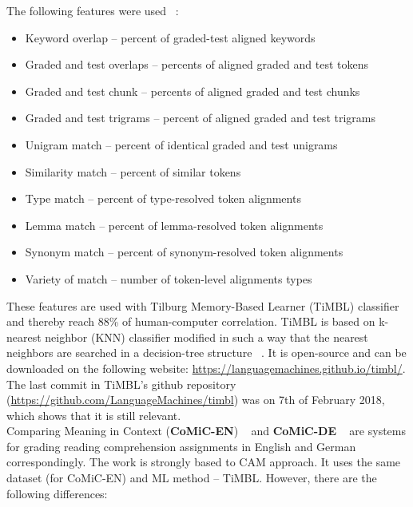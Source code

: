  The following features were used ~\cite{CAM}:
\begin{itemize}
\item Keyword overlap -- percent of graded-test aligned keywords 
\item Graded and test overlaps -- percents of aligned graded and test tokens 
\item Graded and test chunk -- percents of aligned graded and test chunks
\item Graded and test trigrams -- percent of aligned graded and test trigrams
\item Unigram match -- percent of identical graded and test unigrams
\item Similarity match -- percent of similar tokens
\item Type match -- percent of type-resolved token alignments
\item Lemma match -- percent of lemma-resolved token alignments
\item Synonym match -- percent of synonym-resolved token alignments
\item Variety of match -- number of token-level alignments types
\end{itemize}

These features are used with Tilburg Memory-Based Learner (TiMBL) classifier and thereby reach 88\% of human-computer correlation. TiMBL is based on k-nearest neighbor (KNN) classifier modified in such a way that the nearest neighbors are searched in a decision-tree structure ~\cite{TiMBL}. It is open-source and can be downloaded on the following website: \url{https://languagemachines.github.io/timbl/}. The last commit in TiMBL's github repository (\url{https://github.com/LanguageMachines/timbl}) was on 7th of February 2018, which shows that it is still relevant. \\

Comparing Meaning in Context (\textbf{CoMiC-EN}) ~\cite{CoMiC-EN} and \textbf{CoMiC-DE} ~\cite{CoMiC-DE} are systems for grading reading comprehension assignments in English and German correspondingly. The work is strongly based to CAM approach. It uses the same dataset (for CoMiC-EN) and ML method -- TiMBL. However, there are the following differences:

